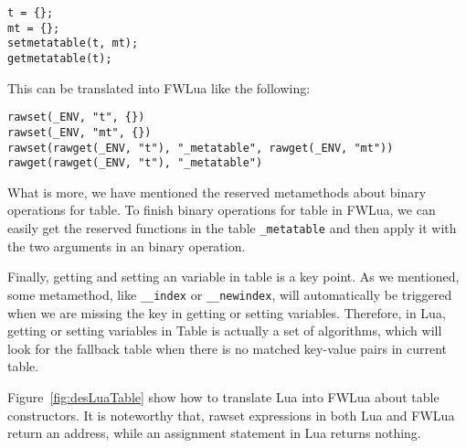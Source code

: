 \begin{verbatim}
t = {};
mt = {};
setmetatable(t, mt);
getmetatable(t);
\end{verbatim}

This can be translated into FWLua like the following:

\begin{verbatim}
rawset(_ENV, "t", {})
rawset(_ENV, "mt", {})
rawset(rawget(_ENV, "t"), "_metatable", rawget(_ENV, "mt"))
rawget(rawget(_ENV, "t"), "_metatable")
\end{verbatim}


What is more, we have mentioned the reserved metamethods about binary operations for table. To finish binary operations for table in FWLua, we can easily get the reserved functions in the table {\tt \_metatable} and then apply it with the two arguments in an binary operation.

Finally, getting and setting an variable in table is a key point. As we mentioned, some metamethod, like {\tt \_\_index} or {\tt \_\_newindex}, will automatically be triggered when we are missing the key in getting or setting variables. Therefore, in Lua, getting or setting variables in Table is actually a set of algorithms, which will look for the fallback table when there is no matched key-value pairs in current table.


Figure~\ref{fig:desLuaTable} show how to translate Lua into FWLua about table constructors. It is noteworthy that, rawset expressions in both Lua and FWLua return an address, while an assignment statement in Lua returns nothing.


